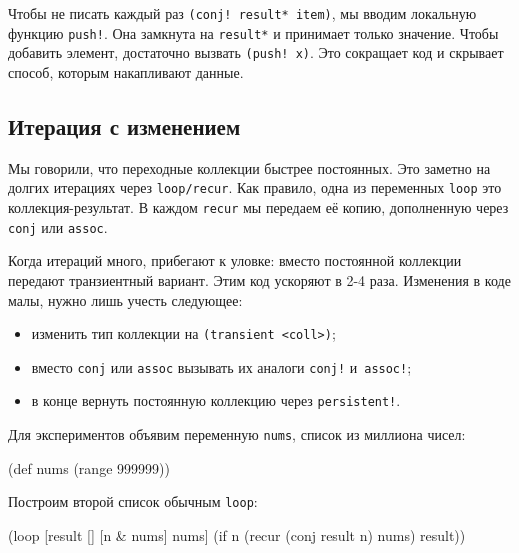 
Чтобы не писать каждый раз \verb|(conj! result* item)|, мы вводим локальную
функцию \verb|push!|. Она замкнута на \verb|result*| и принимает только
значение. Чтобы добавить элемент, достаточно вызвать \verb|(push! x)|. Это
сокращает код и скрывает способ, которым накапливают данные.

\subsection{Итерация с изменением}


Мы говорили, что переходные коллекции быстрее постоянных. Это заметно на долгих
итерациях через \verb|loop/recur|. Как правило, одна из переменных
\verb|loop| это коллекция-результат. В каждом \verb|recur| мы передаем её
копию, дополненную через \verb|conj| или \verb|assoc|.

Когда итераций много, прибегают к уловке: вместо постоянной коллекции передают
транзиентный вариант. Этим код ускоряют в 2-4 раза. Изменения в коде малы,
нужно лишь учесть следующее:

\begin{itemize}

\item
  изменить тип коллекции на \verb|(transient <coll>)|;

\item
  вместо \verb|conj| или \verb|assoc| вызывать их аналоги \verb|conj!|
  и~\verb|assoc!|;

\item
  в конце вернуть постоянную коллекцию через \verb|persistent!|.

\end{itemize}

Для экспериментов объявим переменную \verb|nums|, список из миллиона чисел:

\begin{english}
  \begin{clojure}
(def nums (range 999999))
  \end{clojure}
\end{english}


\noindent
Построим второй список обычным \verb|loop|:

\begin{english}
  \begin{clojure}
(loop [result []
       [n & nums] nums]
  (if n
    (recur (conj result n) nums)
    result))
  \end{clojure}
\end{english}

